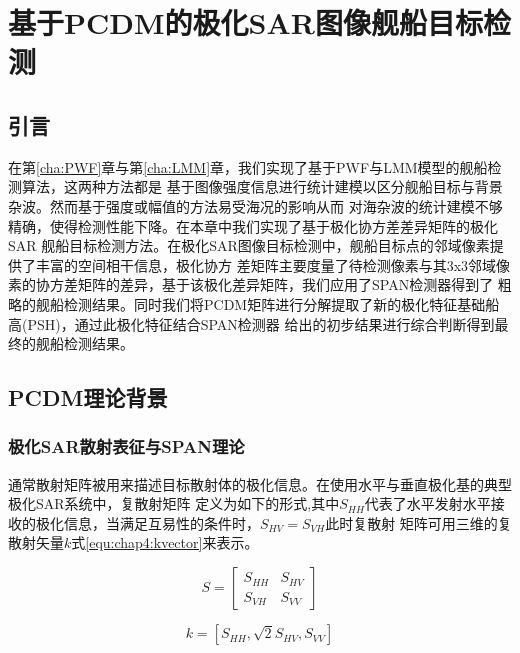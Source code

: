 \chapter{基于PCDM的极化SAR图像舰船目标检测}
\label{cha:PCDM}

\section{引言}
\label{sec:chap4:sec1}
在第\ref{cha:PWF}章与第\ref{cha:LMM}章，我们实现了基于PWF与LMM模型的舰船检测算法，这两种方法都是
基于图像强度信息进行统计建模以区分舰船目标与背景杂波。然而基于强度或幅值的方法易受海况的影响从而
对海杂波的统计建模不够精确，使得检测性能下降。在本章中我们实现了基于极化协方差差异矩阵的极化SAR
舰船目标检测方法。在极化SAR图像目标检测中，舰船目标点的邻域像素提供了丰富的空间相干信息，极化协方
差矩阵主要度量了待检测像素与其3x3邻域像素的协方差矩阵的差异，基于该极化差异矩阵，我们应用了SPAN检测器得到了
粗略的舰船检测结果。同时我们将PCDM矩阵进行分解提取了新的极化特征基础船高(PSH)，通过此极化特征结合SPAN检测器
给出的初步结果进行综合判断得到最终的舰船检测结果。




\section{PCDM理论背景}
\label{sec:chap4:sec2}
\subsection{极化SAR散射表征与SPAN理论}
    通常散射矩阵被用来描述目标散射体的极化信息。在使用水平与垂直极化基的典型极化SAR系统中，复散射矩阵
    定义为如下的形式,其中$S_{HH}$代表了水平发射水平接收的极化信息，当满足互易性的条件时，$S_{HV}=S_{VH}$此时复散射
    矩阵可用三维的复散射矢量$k$式\ref{equ:chap4:kvector}来表示。

    \begin{equation}
        \label{equ:chap4:Smatrix}
        S = \left[ {\begin{array}{*{20}{c}}
        {{S_{HH}}}&{{S_{HV}}}\\
        {{S_{VH}}}&{{S_{VV}}}
        \end{array}} \right]
    \end{equation}

    \begin{equation}
        \label{equ:chap4:kvector}
        k = [{S_{HH}},\sqrt 2 {S_{HV}},{S_{VV}}]
    \end{equation}


